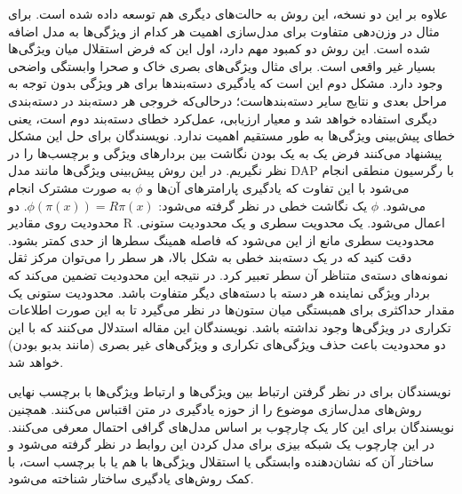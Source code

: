 علاوه بر این دو نسخه، این روش به حالت‌های دیگری هم توسعه داده شده است. برای مثال در \cite{suzuki14} وزن‌دهی متفاوت برای مدل‌سازی اهمیت هر کدام از ویژگی‌ها به مدل اضافه شده است. این روش دو کمبود مهم دارد، اول این که فرض استقلال میان ویژگی‌ها بسیار غیر واقعی است. برای مثال ویژگی‌های بصری خاک و صحرا وابستگی واضحی وجود دارد. مشکل دوم این است که  یادگیری دسته‌بندها برای هر ویژگی بدون توجه به مراحل بعدی و نتایج سایر دسته‌‌بندهاست؛ درحالی‌که خروجی هر دسته‌بند در دسته‌بندی دیگری استفاده خواهد شد و معیار ارزیابی،  عمل‌کرد خطای دسته‌بند دوم است، یعنی خطای پیش‌بینی ویژگی‌ها به طور مستقیم اهمیت ندارد. نویسندگان \cite{ ajoint11} برای حل این مشکل پیشنهاد می‌کنند فرض یک به یک بودن نگاشت بین بردارهای ویژگی و برچسب‌ها را در نظر نگیریم. در این روش پیش‌بینی ویژگی‌ها مانند مدل DAP با رگرسیون منطقی انجام می‌شود با این تفاوت که یادگیری پارامترهای آن‌ها و  $\phi$ به صورت مشترک انجام می‌شود. $\phi$ یک نگاشت خطی در نظر گرفته می‌شود: 
  $\phi(\pi(x)) = R\pi(x) $. 
 دو محدودیت روی مقادیر R اعمال می‌شود. یک محدویت سطری و یک محدودیت ستونی. محدودیت سطری مانع از این می‌شود که فاصله همینگ سطرها از حدی کمتر بشود. دقت کنید که در یک دسته‌بند خطی به شکل بالا، هر سطر را می‌توان مرکز ثقل نمونه‌های دسته‌ی متناظر آن سطر تعبیر کرد. در نتیجه این محدودیت تضمین می‌کند که بردار ویژگی نماینده هر دسته با دسته‌های دیگر متفاوت باشد. محدودیت ستونی یک مقدار حداکثری برای همبستگی میان ستون‌ها در نظر می‌گیرد تا به این صورت اطلاعات تکراری در ویژگی‌ها وجود نداشته باشد. نویسندگان این مقاله استدلال می‌کنند که با این دو محدودیت باعث حذف ویژگی‌های تکراری و ویژگی‌های غیر بصری (مانند بدبو بودن) خواهد شد.
 
نویسندگان \cite{ topicmodel} برای در نظر گرفتن ارتباط بین ویژگی‌ها و ارتباط ویژگی‌ها با برچسب نهایی روش‌های مدل‌سازی موضوع  را از حوزه یادگیری در متن اقتباس می‌کنند. همچنین  نویسندگان \cite{ unified13} برای این کار یک چارچوب بر اساس مدل‌های گرافی احتمال معرفی می‌کنند. در این چارچوب یک شبکه بیزی  برای مدل کردن این روابط در نظر گرفته می‌شود و ساختار آن که نشان‌دهنده وابستگی یا استقلال ویژگی‌ها با هم یا با برچسب است، با کمک روش‌های یادگیری ساختار 
شناخته می‌شود. 


